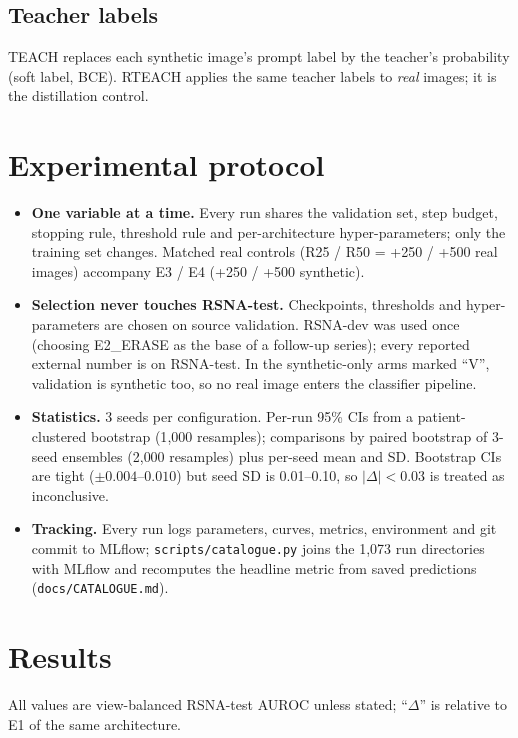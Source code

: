 \documentclass[11pt,a4paper]{article}
\newcommand{\code}[1]{\texttt{\small #1}}
\begin{document}
\subsection{Teacher labels}
TEACH replaces each synthetic image's prompt label by the teacher's probability (soft label, BCE). RTEACH applies the same teacher labels to \emph{real} images; it is the distillation control.

\section{Experimental protocol}
\label{sec:stats}
\begin{itemize}
\item \textbf{One variable at a time.} Every run shares the validation set, step budget, stopping rule, threshold rule and per-architecture hyper-parameters; only the training set changes. Matched real controls (R25 / R50 = +250 / +500 real images) accompany E3 / E4 (+250 / +500 synthetic).
\item \textbf{Selection never touches RSNA-test.} Checkpoints, thresholds and hyper-parameters are chosen on source validation. RSNA-dev was used once (choosing E2\_ERASE as the base of a follow-up series); every reported external number is on RSNA-test. In the synthetic-only arms marked ``V'', validation is synthetic too, so no real image enters the classifier pipeline.
\item \textbf{Statistics.} 3 seeds per configuration. Per-run 95\% CIs from a patient-clustered bootstrap (1{,}000 resamples); comparisons by paired bootstrap of 3-seed ensembles (2{,}000 resamples) plus per-seed mean and SD. Bootstrap CIs are tight ($\pm0.004$--$0.010$) but seed SD is 0.01--0.10, so $|\Delta|<0.03$ is treated as inconclusive.
\item \textbf{Tracking.} Every run logs parameters, curves, metrics, environment and git commit to MLflow; \code{scripts/\allowbreak{}catalogue.py} joins the 1{,}073 run directories with MLflow and recomputes the headline metric from saved predictions (\code{docs/\allowbreak{}CATALOGUE.md}).
\end{itemize}

\section{Results}
All values are view-balanced RSNA-test AUROC unless stated; ``$\Delta$'' is relative to E1 of the same architecture.
\end{document}
